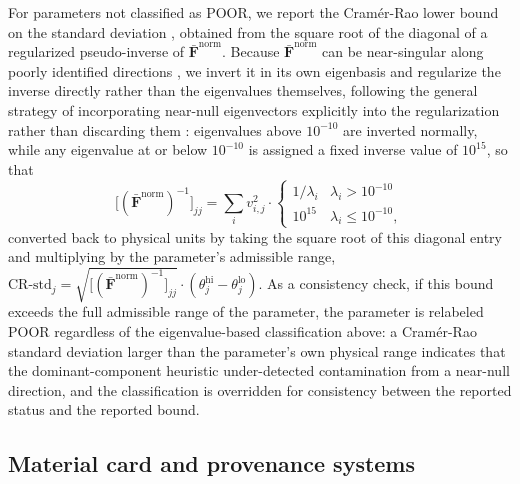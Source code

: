 \documentclass[preprint,review,10pt,number]{elsarticle}
\begin{document}
For parameters not classified as POOR, we report the Cram\'{e}r-Rao lower bound on the standard deviation \citep{walter1997identification}, obtained from the square root of the diagonal of a regularized pseudo-inverse of $\bar{\mathbf{F}}^{\text{norm}}$. Because $\bar{\mathbf{F}}^{\text{norm}}$ can be near-singular along poorly identified directions \citep{quaiser2009systematic}, we invert it in its own eigenbasis and regularize the inverse directly rather than the eigenvalues themselves, following the general strategy of incorporating near-null eigenvectors explicitly into the regularization rather than discarding them \citep{wang2025systematic}: eigenvalues above $10^{-10}$ are inverted normally, while any eigenvalue at or below $10^{-10}$ is assigned a fixed inverse value of $10^{15}$, so that
%
\begin{equation}
    \big[(\bar{\mathbf{F}}^{\text{norm}})^{-1}\big]_{jj} =
    \sum_i v_{i,j}^2 \cdot
    \begin{cases}
        1/\lambda_i & \lambda_i > 10^{-10} \\
        10^{15} & \lambda_i \leq 10^{-10},
    \end{cases}
    \label{eq:cr_bound}
\end{equation}
%
converted back to physical units by taking the square root of this diagonal entry and multiplying by the parameter's admissible range, $\text{CR-std}_j = \sqrt{\big[(\bar{\mathbf{F}}^{\text{norm}})^{-1}\big]_{jj}} \cdot (\theta_j^{\text{hi}} - \theta_j^{\text{lo}})$. As a consistency check, if this bound exceeds the full admissible range of the parameter, the parameter is relabeled POOR regardless of the eigenvalue-based classification above: a Cram\'{e}r-Rao standard deviation larger than the parameter's own physical range indicates that the dominant-component heuristic under-detected contamination from a near-null direction, and the classification is overridden for consistency between the reported status and the reported bound.


\subsection{Material card and provenance systems}
\end{document}
